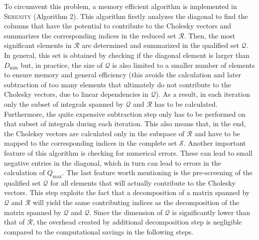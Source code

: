 To circumvent this problem, a memory efficient algorithm is implemented in \textsc{Serenity} (Algorithm 2). This algorithm firstly analyzes the diagonal to find the columns that have the potential to contribute to the Cholesky vectors and summarizes the corresponding indices in the reduced set $\mathcal{R}$. Then, the most significant elements in $\mathcal{R}$ are determined and summarized in the qualified set $\mathcal{Q}$. In general, this set is obtained by checking if the diagonal element is larger than $D_\text{min}$ but, in practice, the size of $\mathcal{Q}$ is also limited to a smaller number of elements to ensure memory and general efficiency (this avoids the calculation and later subtraction of too many elements that ultimately do not contribute to the Cholesky vectors, due to linear dependencies in $\mathcal{Q}$). As a result, in each iteration only the subset of integrals spanned by $\mathcal{Q}$ and $\mathcal{R}$ has to be calculated. Furthermore, the quite expensive subtraction step only has to be performed on that subset of integrals during each iteration. This also means that, in the end, the Choleksy vectors are calculated only in the subspace of $\mathcal{R}$ and have to be mapped to the corresponding indices in the complete set $\mathcal{S}$. Another important feature of this algorithm is checking for numerical errors. These can lead to small negative entries in the diagonal, which in turn can lead to errors in the calculation of $Q_{\text{max}}$. The last feature worth mentioning is the pre-screening of the qualified set $\mathcal{Q}$ for all elements that will actually contribute to the Cholesky vectors. This step exploits the fact that a decomposition of a matrix spanned by $\mathcal{Q}$ and $\mathcal{R}$ will yield the same contributing indices as the decomposition of the matrix spanned by $\mathcal{Q}$ and $\mathcal{Q}$. Since the dimension of $\mathcal{Q}$ is significantly lower than that of $\mathcal{R}$, the overhead created by additional decomposition step is negligible compared to the computational savings in the following steps.

